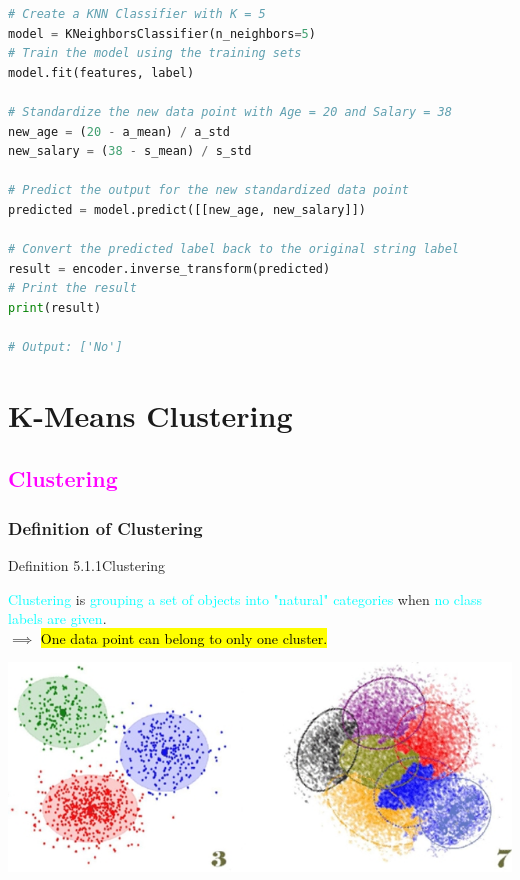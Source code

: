 \documentclass{book}
\begin{document}
\begin{lstlisting}[language=Python, basicstyle=\ttfamily\small, keywordstyle=\color{blue}, commentstyle=\color{forestgreen}, stringstyle=\color{red}]
# Create a KNN Classifier with K = 5
model = KNeighborsClassifier(n_neighbors=5)
# Train the model using the training sets
model.fit(features, label)

# Standardize the new data point with Age = 20 and Salary = 38
new_age = (20 - a_mean) / a_std
new_salary = (38 - s_mean) / s_std

# Predict the output for the new standardized data point
predicted = model.predict([[new_age, new_salary]])

# Convert the predicted label back to the original string label
result = encoder.inverse_transform(predicted)
# Print the result
print(result)

# Output: ['No']
\end{lstlisting}

\chapter{K-Means Clustering}
\textcolor{magenta}{\section{\textbf{Clustering}}}
\subsection{Definition of Clustering}
\begin{defBox}{Definition 5.1.1}{Clustering}
    \raggedright
    \textcolor{cyan}{Clustering} is \textcolor{cyan}{grouping a set of objects into "natural" categories} when \textcolor{cyan}{no class labels are given}.\\
    $\implies$ \hl{One data point can belong to only one cluster.}\\
    \begin{center}
        \includegraphics[scale=0.5]{chapter 5/ch5_figure1.jpeg}
    \end{center}
\end{defBox}
\end{document}
